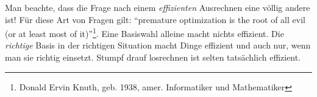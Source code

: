 \begin{remark}
\begin{itemize}
\medbreak
Man beachte, dass die Frage nach einem \emph{effizienten} Ausrechnen eine völlig andere ist! Für diese Art von Fragen gilt: \enquote{premature optimization is the root of all evil (or at least most of it)}\footnote{Donald Ervin Knuth, geb. 1938, amer. Informatiker und Mathematiker}. Eine Basiswahl alleine macht nichts effizient. Die \emph{richtige} Basis in der richtigen Situation macht Dinge effizient und auch nur, wenn man sie richtig einsetzt. Stumpf drauf losrechnen ist selten tatsächlich effizient.
\end{itemize}
\end{remark}